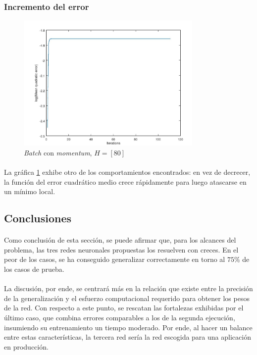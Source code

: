 \documentclass[12pt, twocolumn]{article}
\begin{document}
	\subsubsection{Incremento del error}
	
	\begin{figure}[H]
		\centering
		\includegraphics[width=9cm]{../results/other_architectures/batch_momentum_80/b_m_80.jpg}
		\caption{\textit{Batch} con \textit{momentum}, $H = \left[80\right]$}
		\label{bm80}
	\end{figure}
	
	\paragraph{} La gráfica \ref{bm80} exhibe otro de los comportamientos encontrados: en vez de decrecer, la función del error cuadrático medio crece rápidamente para luego atascarse en un mínimo local. 
	
	\subsection{Conclusiones}
	
	\paragraph{} Como conclusión de esta sección, se puede afirmar que, para los alcances del problema, las tres redes neuronales propuestas los resuelven con creces. En el peor de los casos, se ha conseguido generalizar correctamente en torno al $75\%$ de los casos de prueba.
	
	\paragraph{} La discusión, por ende, se centrará más en la relación que existe entre la precisión de la generalización y el esfuerzo computacional requerido para obtener los pesos de la red. Con respecto a este punto, se rescatan las fortalezas exhibidas por el último caso, que combina errores comparables a los de la segunda ejecución, insumiendo su entrenamiento un tiempo moderado. Por ende, al hacer un balance entre estas características, la tercera red sería la red escogida para una aplicación en producción.
	
\end{document}
